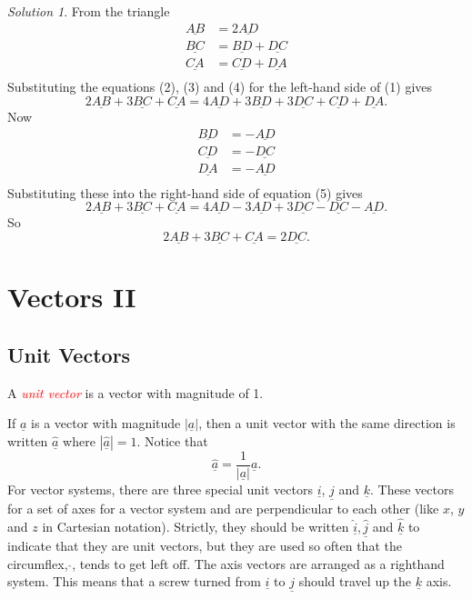 \documentclass[
  11pt,
  oneside]{book}
\newcommand{\slide}{}
\theoremstyle{definition}
\theoremstyle{definition}
\theoremstyle{definition}
\theoremstyle{definition}
\theoremstyle{remark}
\newtheorem*{solution}{Solution}
\begin{document}
\begin{solution}
From the triangle
\begin{align*}
\underline{AB}&=2\underline{AD}\tag{2}\\
\underline{BC}&=\underline{BD}+\underline{DC}\tag{3}\\
\underline{CA}&=\underline{CD}+\underline{DA}\tag{4}\\
\end{align*}
Substituting the equations (2), (3) and (4) for the left-hand side of (1) gives
\[
2\underline{AB}+3\underline{BC}+\underline{CA}=4\underline{AD}+3\underline{BD}+3\underline{DC}+\underline{CD}+\underline{DA}.\tag{5}
\]
Now
\begin{align*}
\underline{BD}&=-\underline{AD}\tag{6}\\
\underline{CD}&=-\underline{DC}\tag{7}\\
\underline{DA}&=-\underline{AD}\tag{8}\\
\end{align*}
Substituting these into the right-hand side of equation (5) gives
\[
2\underline{AB}+3\underline{BC}+\underline{CA}=4\underline{AD}-3\underline{AD}+3\underline{DC}-\underline{DC}-\underline{AD}.
\]
So
\[
2\underline{AB}+3\underline{BC}+\underline{CA} = 2\underline{DC}.
\]
\end{solution}

\slide

\section{Vectors II}\label{vectors-ii}

\subsection{Unit Vectors}\label{unit-vectors}

A \textcolor{red}{\em unit vector} is a vector with magnitude of 1.

If \(\underline a\) is a vector with magnitude \(|\underline a|\), then a unit vector with the same direction is written \(\hat{\underline a}\) where \(|\hat{\underline a}| = 1\). Notice that
\[
\hat{\underline a} = \frac1{|\underline a|}{\underline a}.
\]
For vector systems, there are three special unit vectors \(\underline i\), \(\underline j\) and \(\underline k\). These vectors for a set of axes for a vector system and are perpendicular to each other (like \(x\), \(y\) and \(z\) in Cartesian notation). Strictly, they should be written \(\hat{\underline i}, \hat{\underline j}\) and \(\hat{\underline k}\) to indicate that they are unit vectors, but they are used so often that the circumflex, \(\hat{}\), tends to get left off. The axis vectors are arranged as a righthand system. This means that a screw turned from \(\underline i\) to \(\underline j\) should travel up the \(\underline k\) axis.
\end{document}
